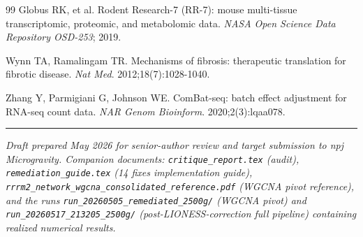 \documentclass[11pt]{article}
\newcommand{\code}[1]{\texttt{#1}}
\begin{document}
\begin{thebibliography}{99}
 Globus RK, et al. Rodent Research-7 (RR-7): mouse multi-tissue transcriptomic, proteomic, and metabolomic data. \emph{NASA Open Science Data Repository OSD-253}; 2019.

 Wynn TA, Ramalingam TR. Mechanisms of fibrosis: therapeutic translation for fibrotic disease. \emph{Nat Med}. 2012;18(7):1028-1040.

 Zhang Y, Parmigiani G, Johnson WE. ComBat-seq: batch effect adjustment for RNA-seq count data. \emph{NAR Genom Bioinform}. 2020;2(3):lqaa078.

\end{thebibliography}

\vspace{1em}
\begin{center}
\rule{0.4\textwidth}{0.4pt}
\end{center}
\vspace{0.3em}
\noindent\textit{Draft prepared May 2026 for senior-author review and target submission to npj Microgravity. Companion documents: \code{critique\_report.tex} (audit), \code{remediation\_guide.tex} (14 fixes implementation guide), \code{rrrm2\_network\_wgcna\_consolidated\_reference.pdf} (WGCNA pivot reference), and the runs \code{run\_20260505\_remediated\_2500g/} (WGCNA pivot) and \code{run\_20260517\_213205\_2500g/} (post-LIONESS-correction full pipeline) containing realized numerical results.}
\end{document}
